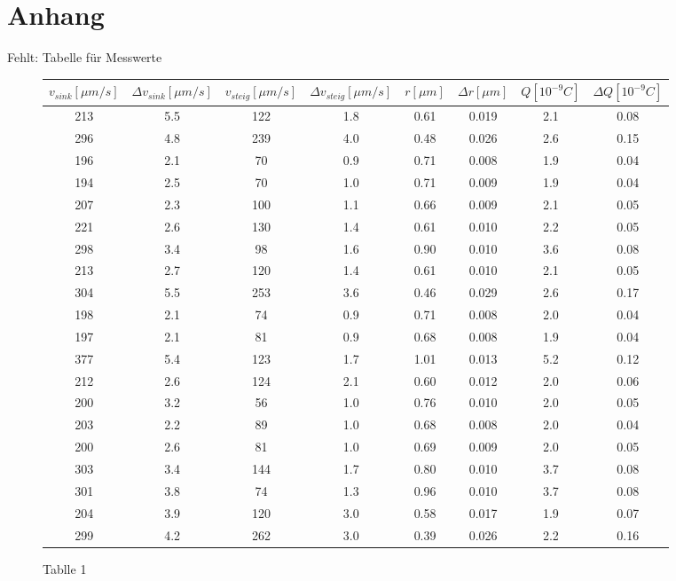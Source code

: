 \documentclass{scrartcl}
\begin{document}
\section{Anhang}
	Fehlt: Tabelle für Messwerte
	\begin{figure}[H]
		\begin{tabular}{c|c|c|c|c|c|c|c}
			\caption{Tablle 1}
			\label{test}
			\hline
			$v_{sink} [\mu m/s]$ & $\Delta v_{sink} [\mu m/s]$ & $v_{steig} [\mu m/s]$ &$\Delta v_{steig} [\mu m/s]$ & $r [\mu m] $&$ \Delta r [\mu m]$ &$ Q [10^{-9} C] $&$ \Delta Q [10^{-9} C]$\\
			\hline
			213 & 5.5 & 122 & 1.8 & 0.61 & 0.019 & 2.1 & 0.08\\
			296 & 4.8 & 239 & 4.0 & 0.48 & 0.026 & 2.6 & 0.15\\
			196 & 2.1 & 70 & 0.9 & 0.71 & 0.008 & 1.9 & 0.04\\
			194 & 2.5 & 70 & 1.0 & 0.71 & 0.009 & 1.9 & 0.04\\
			207 & 2.3 & 100 & 1.1 & 0.66 & 0.009 & 2.1 & 0.05\\
			221 & 2.6 & 130 & 1.4 & 0.61 & 0.010 & 2.2 & 0.05\\
			298 & 3.4 & 98 & 1.6 & 0.90 & 0.010 & 3.6 & 0.08\\
			213 & 2.7 & 120 & 1.4 & 0.61 & 0.010 & 2.1 & 0.05\\
			304 & 5.5 & 253 & 3.6 & 0.46 & 0.029 & 2.6 & 0.17\\
			198 & 2.1 & 74 & 0.9 & 0.71 & 0.008 & 2.0 & 0.04\\
			197 & 2.1 & 81 & 0.9 & 0.68 & 0.008 & 1.9 & 0.04\\
			377 & 5.4 & 123 & 1.7 & 1.01 & 0.013 & 5.2 & 0.12\\
			212 & 2.6 & 124 & 2.1 & 0.60 & 0.012 & 2.0 & 0.06\\
			200 & 3.2 & 56 & 1.0 & 0.76 & 0.010 & 2.0 & 0.05\\
			203 & 2.2 & 89 & 1.0 & 0.68 & 0.008 & 2.0 & 0.04\\
			200 & 2.6 & 81 & 1.0 & 0.69 & 0.009 & 2.0 & 0.05\\
			303 & 3.4 & 144 & 1.7 & 0.80 & 0.010 & 3.7 & 0.08\\
			301 & 3.8 & 74 & 1.3 & 0.96 & 0.010 & 3.7 & 0.08\\
			204 & 3.9 & 120 & 3.0 & 0.58 & 0.017 & 1.9 & 0.07\\
			299 & 4.2 & 262 & 3.0 & 0.39 & 0.026 & 2.2 & 0.16\\
		\end{tabular}
	\end{figure}
\end{document}
